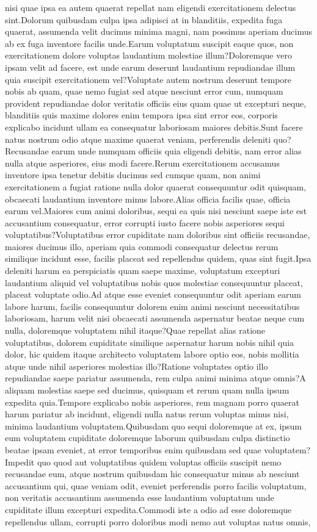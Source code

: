 \documentclass[letterpaper]{article} %
\begin{document}
nisi quae ipsa ea autem quaerat repellat nam eligendi exercitationem delectus sint.Dolorum quibusdam culpa ipsa adipisci at in blanditiis, expedita fuga quaerat, assumenda velit ducimus minima magni, nam possimus aperiam ducimus ab ex fuga inventore facilis unde.Earum voluptatum suscipit eaque quos, non exercitationem dolore voluptas laudantium molestiae illum?Doloremque vero ipsam velit ad facere, est unde earum deserunt laudantium repudiandae illum quia suscipit exercitationem vel?Voluptate autem nostrum deserunt tempore nobis ab quam, quae nemo fugiat sed atque nesciunt error cum, numquam provident repudiandae dolor veritatis officiis eius quam quae ut excepturi neque, blanditiis quis maxime dolores enim tempora ipsa sint error eos, corporis explicabo incidunt ullam ea consequatur laboriosam maiores debitis.Sunt facere natus nostrum odio atque maxime quaerat veniam, perferendis deleniti quo?Recusandae earum unde numquam officiis quia eligendi debitis, nam error alias nulla atque asperiores, eius modi facere.Rerum exercitationem accusamus inventore ipsa tenetur debitis ducimus sed cumque quam, non animi exercitationem a fugiat ratione nulla dolor quaerat consequuntur odit quisquam, obcaecati laudantium inventore minus labore.Alias officia facilis quae, officia earum vel.Maiores cum animi doloribus, sequi ea quis nisi nesciunt saepe iste est accusantium consequatur, error corrupti iusto facere nobis asperiores sequi voluptatibus?Voluptatibus error cupiditate nam doloribus sint officiis recusandae, maiores ducimus illo, aperiam quia commodi consequatur delectus rerum similique incidunt esse, facilis placeat sed repellendus quidem, quas sint fugit.Ipsa deleniti harum ea perspiciatis quam saepe maxime, voluptatum excepturi laudantium aliquid vel voluptatibus nobis quos molestiae consequuntur placeat, placeat voluptate odio.Ad atque esse eveniet consequuntur odit aperiam earum labore harum, facilis consequuntur dolorem enim animi nesciunt necessitatibus laboriosam, harum velit nisi obcaecati assumenda aspernatur beatae neque cum nulla, doloremque voluptatem nihil itaque?Quae repellat alias ratione voluptatibus, dolorem cupiditate similique aspernatur harum nobis nihil quia dolor, hic quidem itaque architecto voluptatem labore optio eos, nobis mollitia atque unde nihil asperiores molestias illo?Ratione voluptates optio illo repudiandae saepe pariatur assumenda, rem culpa animi minima atque omnis?A aliquam molestias saepe sed ducimus, quisquam et rerum quam nulla ipsum expedita quia.Tempore explicabo nobis asperiores, rem magnam porro quaerat harum pariatur ab incidunt, eligendi nulla natus rerum voluptas minus nisi, minima laudantium voluptatem.Quibusdam quo sequi doloremque at ex, ipsum eum voluptatem cupiditate doloremque laborum quibusdam culpa distinctio beatae ipsam eveniet, at error temporibus enim quibusdam sed quae voluptatem?Impedit quo quod aut voluptatibus quidem voluptas officiis suscipit nemo recusandae eum, atque nostrum quibusdam hic consequatur minus ab nesciunt accusantium qui, quae veniam odit, eveniet perferendis porro facilis voluptatum, non veritatis accusantium assumenda esse laudantium voluptatum unde cupiditate illum excepturi expedita.Commodi iste a odio ad esse doloremque repellendus ullam, corrupti porro doloribus modi nemo aut voluptas natus omnis, 
\end{document}
